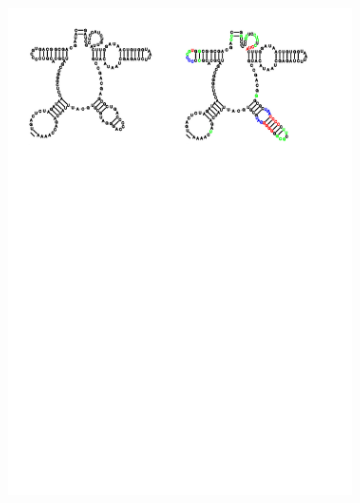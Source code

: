 \begin{figure}
\begin{subfigure}{\wi}
    \includegraphics[clip, trim=10.5cm 21cm 2.5cm 1cm, width=1\textwidth]{../img/alg/insert/multibranch}
  \end{subfigure}


\end{figure}
